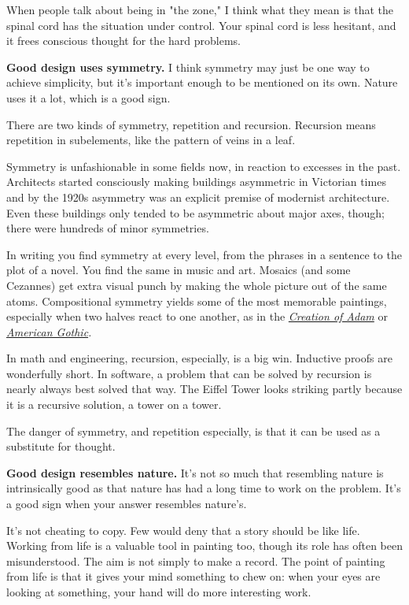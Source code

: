When people talk about being in
"the zone," I think what they mean is that the
spinal cord has the situation under control.
Your spinal cord is less hesitant, and
it frees conscious thought for the hard problems.




\textbf{Good design uses symmetry.}
I think symmetry may just
be one way to achieve simplicity, but it's important enough
to be mentioned on its own.
Nature uses it a lot, which is a good sign.

There are two kinds of symmetry, repetition and recursion.
Recursion means repetition in subelements, like the
pattern of veins in a leaf.

Symmetry is unfashionable in some fields now, in reaction to
excesses in the past.  Architects started consciously
making buildings asymmetric in Victorian times and by the
1920s asymmetry was an explicit premise of modernist architecture.
Even these buildings only tended to be asymmetric
about major axes, though; there were hundreds of minor symmetries.

In writing you find symmetry at every level, from the phrases
in a sentence to the plot of a novel.  You find the same
in music and art.
Mosaics (and some Cezannes) get extra visual punch by making
the whole picture out of the same atoms.  Compositional 
symmetry yields some of the most memorable paintings,  
especially when two halves react to one another, as in 
the \emph{\href{http://www.paulgraham.com/symptg.html}{Creation of Adam}} or 
\emph{\href{http://www.paulgraham.com/symptg.html}{American Gothic}.}

In math and engineering, recursion, especially, is a big win.
Inductive proofs are wonderfully short.  In software,
a problem that can be solved by recursion is nearly always
best solved that way. The Eiffel Tower looks striking partly
because it is a recursive solution, a tower on a tower.

The danger of symmetry, and repetition especially, is that
it can be used as a substitute for thought.



\textbf{Good design resembles nature.}  It's not so much that
resembling nature is intrinsically good as that nature
has had a long time to work on the
problem.  It's a good sign when your answer resembles nature's.

It's not cheating to copy.
Few would deny that a story should be like life.
Working from life is a valuable tool in painting too, though its
role has often been misunderstood.
The aim is not simply to make a record.
The point of painting from life is
that it gives your mind something to chew on:  when your
eyes are looking at something, your hand will do more
interesting work.

